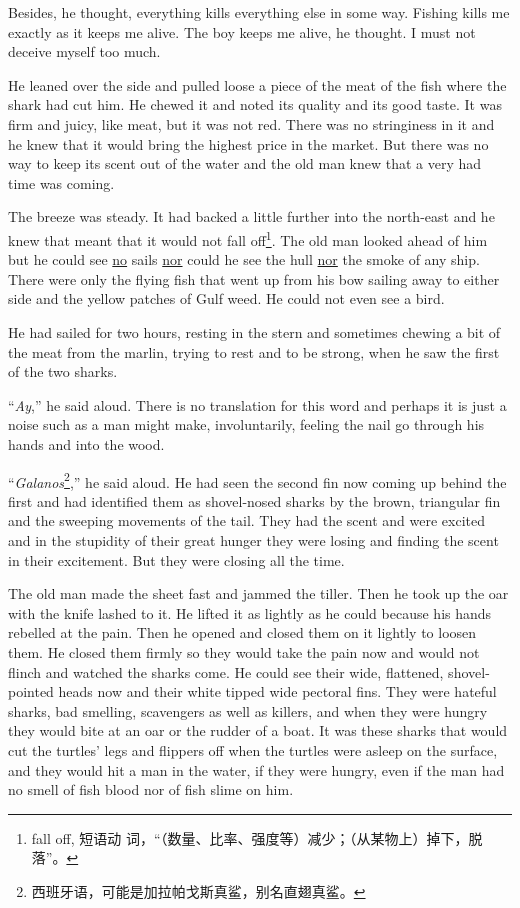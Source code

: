 \documentclass[fontset=ubuntu,zihao=-4]{ctexrep}
\begin{document}
Besides, he thought, everything kills everything else in some way. Fishing
kills me exactly as it keeps me alive. The boy keeps me alive, he thought. I
must not \gls{deceive} myself too much.

He leaned over the side and pulled loose a piece of the meat of the fish
where the shark had cut him. He chewed it and noted its \gls{quality} and its
good taste. It was firm and juicy, like meat, but it was not red. There was
no \gls{stringiness} in it and he knew that it would bring the highest price
in the market. But there was no way to keep its scent out of the water and
the old man knew that a very had time was coming.

The breeze was steady. It had backed a little further into the north-east
and he knew that meant that it would not fall off\footnote{fall off, 短语动
  词，“（数量、比率、强度等）减少；（从某物上）掉下，脱落”。}. The old man
looked ahead of him but he could see \uline{no} sails \uline{nor} could he see the
\gls{hull} \uline{nor} the smoke of any ship. There were only the flying fish that
went up from his bow sailing away to either side and the yellow patches of
Gulf weed. He could not even see a bird.

He had sailed for two hours, resting in the stern and sometimes chewing a
bit of the meat from the marlin, trying to rest and to be strong, when he
saw the first of the two sharks.

``\emph{Ay},'' he said aloud. There is no \gls{translation} for this word and
perhaps it is just a noise such as a man might make, \gls{involuntarily},
feeling the \gls{nail} go through his hands and into the wood.

``\emph{Galanos}\footnote{西班牙语，可能是加拉帕戈斯真鲨，别名直翅真鲨。},'' he
said aloud. He had seen the second fin now coming up behind the first and
had \gls{identified} them as \gls{shovel}-nosed sharks by the brown,
\gls{triangular} fin and the sweeping movements of the tail. They had the
scent and were excited and in the \gls{stupidity} of their great hunger they
were losing and finding the scent in their \gls{excitement}. But they were
closing all the time.

The old man made the sheet fast and \gls{jammed} the tiller. Then he took up
the oar with the knife lashed to it. He lifted it as lightly as he could
because his hands \gls{rebelled} at the pain. Then he opened and closed them
on it lightly to loosen them. He closed them firmly so they would take the
pain now and would not \gls{flinch} and watched the sharks come. He could
see their wide, flattened, shovel-pointed heads now and their white
tipped wide pectoral fins. They were \gls{hateful} sharks, bad
smelling, scavengers as well as killers, and when they were hungry they
would bite at an oar or the \gls{rudder} of a boat. It was these sharks that would
cut the turtles' legs and \glspl{flipper} off when the turtles were asleep
on the surface, and they would hit a man in the water, if they were hungry,
even if the man had no smell of fish blood nor of fish \gls{slime} on him.
\end{document}
